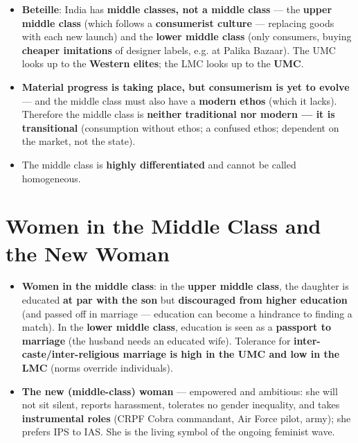 \begin{KeyConcept}
\begin{itemize}
\item \textbf{Beteille}: India has \textbf{middle classes, not a middle class} --- the \textbf{upper middle class} (which follows a \textbf{consumerist culture} --- replacing goods with each new launch) and the \textbf{lower middle class} (only consumers, buying \textbf{cheaper imitations} of designer labels, e.g. at Palika Bazaar). The UMC looks up to the \textbf{Western elites}; the LMC looks up to the \textbf{UMC}.
\item \textbf{Material progress is taking place, but consumerism is yet to evolve} --- and the middle class must also have a \textbf{modern ethos} (which it lacks). Therefore the middle class is \textbf{neither traditional nor modern --- it is transitional} (consumption without ethos; a confused ethos; dependent on the market, not the state).
\item The middle class is \textbf{highly differentiated} and cannot be called homogeneous.
\end{itemize}
\end{KeyConcept}

\section{Women in the Middle Class and the New Woman}

\begin{KeyConcept}
\begin{itemize}
\item \textbf{Women in the middle class}: in the \textbf{upper middle class}, the daughter is educated \textbf{at par with the son} but \textbf{discouraged from higher education} (and passed off in marriage --- education can become a hindrance to finding a match). In the \textbf{lower middle class}, education is seen as a \textbf{passport to marriage} (the husband needs an educated wife). Tolerance for \textbf{inter-caste/inter-religious marriage is high in the UMC and low in the LMC} (norms override individuals).
\item \textbf{The new (middle-class) woman} --- empowered and ambitious: she will not sit silent, reports harassment, tolerates no gender inequality, and takes \textbf{instrumental roles} (CRPF Cobra commandant, Air Force pilot, army); she prefers IPS to IAS. She is the living symbol of the ongoing feminist wave.
\end{itemize}
\end{KeyConcept}

